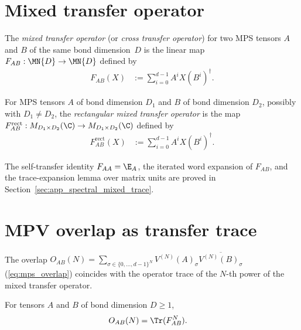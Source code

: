 \section{Mixed transfer operator}

\begin{definition}\label{def:mixed_transfer}
    \leanok
    The \emph{mixed transfer operator} (or \emph{cross transfer operator})
    for two MPS tensors $A$ and $B$ of the same bond dimension~$D$ is the
    linear map $F_{AB}:\MN{D}\to\MN{D}$ defined by
    \begin{align}
        F_{AB}(X)
         & :=\sum_{i=0}^{d-1}A^iX(B^i)^\dagger.
        \label{eq:spectral_mixed_transfer}
    \end{align}
\end{definition}

\begin{definition}\label{def:mixed_transfer_rect}
    \leanok
    For MPS tensors $A$ of bond dimension $D_1$ and $B$ of bond
    dimension $D_2$, possibly with $D_1\neq D_2$, the
    \emph{rectangular mixed transfer operator} is the map
    $F_{AB}^{\mathrm{rect}}:
        M_{D_1\times D_2}(\C)\to M_{D_1\times D_2}(\C)$ defined by
    \begin{align}
        F_{AB}^{\mathrm{rect}}(X)
         & :=\sum_{i=0}^{d-1}A^iX(B^i)^\dagger.
        \label{eq:spectral_mixed_transfer_rect}
    \end{align}
\end{definition}

The self-transfer identity $F_{AA}=\E_A$, the iterated word expansion of
$F_{AB}$, and the trace-expansion lemma over matrix units are proved in
Section~\ref{sec:app_spectral_mixed_trace}.

\section{MPV overlap as transfer trace}

The overlap $O_{AB}(N)=\sum_{\sigma\in\{0,\ldots,d{-}1\}^N}
    V^{(N)}(A)_\sigma\overline{V^{(N)}(B)_\sigma}$ (\ref{eq:mps_overlap})
coincides with the operator trace of the $N$-th power of the mixed transfer
operator.

\begin{lemma}\label{thm:overlap_trace}
    \leanok
    For tensors $A$ and $B$ of bond dimension $D\geq1$,
    \begin{align}
        O_{AB}(N)
         & =\Tr(F_{AB}^N).
        \label{eq:spectral_overlap_trace}
    \end{align}
\end{lemma}

